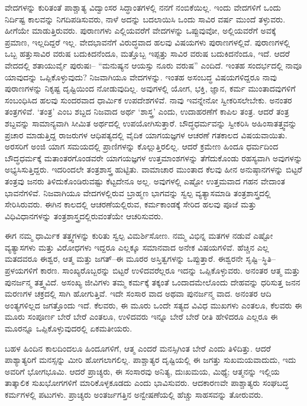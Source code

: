 ವೇದಗಳನ್ನು ಕುರಿತಂತೆ ಪಾಶ್ಚಾತ್ಯ ವಿದ್ವಾಂಸರ ಸಿದ್ಧಾಂತಗಳಲ್ಲಿ ನನಗೆ ನಂಬಿಕೆಯಿಲ್ಲ. ಇಂದು ವೇದಗಳಿಗೆ ಒಂದು ನಿರ್ದಿಷ್ಟ ಕಾಲವನ್ನು ನಿಗದಿಪಡಿಸುವರು, ನಾಳೆ ಅದನ್ನು ಬದಲಾಯಿಸಿ ಒಂದು ಸಾವಿರ ವರ್ಷ ಮುಂದೆ ತಳ್ಳುವರು. ಹೀಗೆಯೇ ಮಾಡುತ್ತಿರುವರು. ಪುರಾಣಗಳು ಎಲ್ಲಿಯವರೆಗೆ ವೇದಗಳನ್ನು ಒಪ್ಪುವುವೋ, ಅಲ್ಲಿಯವರೆಗೆ ಅವಕ್ಕೆ ಪ್ರಮಾಣ, ಇಲ್ಲದಿದ್ದರೆ ಇಲ್ಲ. ವೇದಭಾವನೆಗೆ ವಿರುದ್ಧವಾದ ಹಲವು ವಿಷಯಗಳು ಪುರಾಣಗಳಲ್ಲಿವೆ. ಪುರಾಣಗಳಲ್ಲಿ ಒಬ್ಬ ಹತ್ತುಸಾವಿರ ವರುಷ ಬದುಕಿದನೆಂದೂ, ಮತ್ತೊಬ್ಬ ಇಪ್ಪತ್ತು ಸಾವಿರ ವರುಷ ಬದುಕಿದನೆಂದೂ, ಇದೆ. ಆದರೆ ವೇದದಲ್ಲಿ ಶತಾಯುರ್ವೈ ಪುರುಷಃ– “ಮನುಷ್ಯನ ಆಯಸ್ಸು ನೂರು ವರುಷ” ಎಂದಿದೆ. ಇಂತಹ ಸಂದರ್ಭದಲ್ಲಿ ನಾವೂ ಯಾವುದನ್ನು ಒಪ್ಪಿಕೊಳ್ಳುವುದು? ನಿಜವಾಗಿಯೂ ವೇದಗಳನ್ನು. ಇಂತಹ ಅಸಂಬದ್ಧ ವಿಷಯಗಳಿದ್ದರೂ ನಾವು ಪುರಾಣಗಳನ್ನು ನಿಕೃಷ್ಟ ದೃಷ್ಟಿಯಿಂದ ನೋಡುವುದಿಲ್ಲ. ಅವುಗಳಲ್ಲಿ ಯೋಗ, ಭಕ್ತಿ, ಜ್ಞಾನ, ಕರ್ಮ ಮುಂತಾದವುಗಳಿಗೆ ಸಂಬಂಧಿಸಿದ ಹಲವು ಸುಂದರವಾದ ಧಾರ್ಮಿಕ ಉಪದೇಶಗಳಿವೆ. ನಾವು ಇವನ್ನೇನೋ ಸ್ವೀಕರಿಸಲೇಬೇಕು. ಅನಂತರ ತಂತ್ರಗಳಿವೆ. ‘ತಂತ್ರ’ ಎಂಬ ಶಬ್ದದ ನಿಜವಾದ ಅರ್ಥ ‘ಶಾಸ್ತ್ರ’ ಎಂದು, ಉದಾಹರಣೆಗೆ ಕಾಪಿಲ ತಂತ್ರ. ಆದರೆ ತಂತ್ರ ಶಬ್ದವನ್ನು ಸಾಮಾನ್ಯವಾಗಿ ಸೀಮಿತ ಅರ್ಥದಲ್ಲಿ ಉಪಯೋಗಿಸುತ್ತಾರೆ. ಬೌದ್ಧಧರ್ಮವನ್ನು ಸ್ವೀಕರಿಸಿ ಅಹಿಂಸಾತತ್ತ್ವವನ್ನು ಪ್ರಚಾರ ಮಾಡುತ್ತಿದ್ದ ರಾಜರುಗಳ ಆಧಿಪತ್ಯದಲ್ಲಿ ವೈದಿಕ ಯಾಗಯಜ್ಞಗಳ ಆಚರಣೆ ಗತಕಾಲದ ವಿಷಯವಾಯಿತು. ಅರಸರಿಗೆ ಅಂಜಿ ಯಾಗ ಸಮಯದಲ್ಲಿ ಪ್ರಾಣಿಗಳನ್ನು ಕೊಲ್ಲುತ್ತಿರಲಿಲ್ಲ. ಆದರೆ ಕ್ರಮೇಣ ಹಿಂದೂ ಧರ್ಮದಿಂದ ಬೌದ್ಧಧರ್ಮಕ್ಕೆ ಮತಾಂತರಗೊಂಡವರೇ ಯಾಗಯಜ್ಞಗಳ ಉತ್ತಮಾಂಶಗಳನ್ನು ತೆಗೆದುಕೊಂಡು ರಹಸ್ಯವಾಗಿ ಅವುಗಳನ್ನು ಅಭ್ಯಸಿಸುತ್ತಿದ್ದರು. ಇದರಿಂದಲೇ ತಂತ್ರಶಾಸ್ತ್ರ ಹುಟ್ಟಿತು. ವಾಮಾಚಾರ ಮುಂತಾದ ಕೆಲವು ಹೀನ ಅನುಷ್ಠಾನಗಳನ್ನು ಬಿಟ್ಟರೆ ತಂತ್ರವು ಜನರು ತಿಳಿದುಕೊಂಡಿರುವಷ್ಟು ಕೆಟ್ಟದೇನೂ ಅಲ್ಲ. ಅವುಗಳಲ್ಲಿ ಎಷ್ಟೋ ಉತ್ತಮವಾದ ಗಹನ ವೇದಾಂತ ಭಾವನೆಗಳಿವೆ. ನಿಜವಾಗಿಯೂ ವೇದಗಳಲ್ಲಿರುವ ಬ್ರಾಹ್ಮಣ ಭಾಗವನ್ನು ಸ್ವಲ್ಪ ವ್ಯತ್ಯಾಸಮಾಡಿ ತಂತ್ರಶಾಸ್ತ್ರದಲ್ಲಿ ಸೇರಿಸಿರುವರು. ಈಗಿನ ಕಾಲದಲ್ಲಿ ಆಚರಣೆಯಲ್ಲಿರುವ, ಕರ್ಮಕಾಂಡಕ್ಕೆ ಸೇರಿದ ಹಲವು ಪೂಜೆ ಮತ್ತು ವಿಧಿವಿಧಾನಗಳನ್ನು ತಂತ್ರಶಾಸ್ತ್ರದಲ್ಲಿರುವಂತೆಯೇ ಆಚರಿಸುವರು.

ಈಗ ನಮ್ಮ ಧಾರ್ಮಿಕ ತತ್ತ್ವಗಳನ್ನು ಕುರಿತು ಸ್ವಲ್ಪ ವಿಮರ್ಶಿಸೋಣ. ನಮ್ಮ ವಿಭಿನ್ನ ಮತಗಳ ನಡುವೆ ಎಷ್ಟೋ ವ್ಯತ್ಯಾಸಗಳು ಮತ್ತು ವಿರೋಧಗಳು ಇದ್ದರೂ ಎಲ್ಲಕ್ಕೂ ಸಮಾನವಾದ ಅನೇಕ ವಿಷಯಗಳಿವೆ. ಹೆಚ್ಚಿನ ಎಲ್ಲ ಮತದವರೂ ಈಶ್ವರ, ಆತ್ಮ ಮತ್ತು ಜಗತ್​–ಈ ಮೂರರ ಅಸ್ತಿತ್ವಗಳನ್ನು ಒಪ್ಪುತ್ತಾರೆ. ಈಶ್ವರನೇ ಸೃಷ್ಟಿ–ಸ್ಥಿತಿ–ಪ್ರಳಯಗಳಿಗೆ ಕಾರಣ. ಸಾಂಖ್ಯರೊಬ್ಬರನ್ನು ಬಿಟ್ಟರೆ ಉಳಿದವರೆಲ್ಲರೂ ಇದನ್ನು ಒಪ್ಪಿಕೊಳ್ಳುವರು. ಅನಂತರ ಆತ್ಮ ಮತ್ತು ಪುನರ್ಜನ್ಮ ತತ್ತ್ವವಿದೆ. ಅಸಂಖ್ಯ ಜೀವಿಗಳು ತಮ್ಮ ಕರ್ಮಕ್ಕೆ ತಕ್ಕಂತೆ ಒಂದಾದಮೇಲೊಂದು ದೇಹವನ್ನು ಧರಿಸುತ್ತ ಜನನ ಮರಣಗಳ ಚಕ್ರದಲ್ಲಿ ಸಾಗಿ ಹೋಗುತ್ತಿವೆ. ಇದೇ ಸಂಸಾರ ವಾದ ಅಥವಾ ಪುನರ್ಜನ್ಮ ವಾದ. ಅನಂತರ ಆದಿ ಅಂತ್ಯಗಳಿಲ್ಲದ ಜಗತ್ತೊಂದು ಇದೆ. ಕೆಲವರು, ಈ ಮೂರು ಒಂದೇ ಸತ್ಯದ ವಿವಿಧ ಮುಖಗಳು ಎಂತಲೂ, ಕೆಲವರು ಈ ಮೂರು ಸಂಪೂರ್ಣ ಬೇರೆ ಬೇರೆ ಎಂತಲೂ, ಉಳಿದವರು ಇನ್ನೂ ಬೇರೆ ಬೇರೆ ರೀತಿ ಹೇಳಿದರೂ ಎಲ್ಲರೂ ಈ ಮೂರನ್ನೂ ಒಪ್ಪಿಕೊಳ್ಳುವುದರಲ್ಲಿ ಏಕಮತೀಯರು.

\vskip 4pt

ಬಹಳ ಹಿಂದಿನ ಕಾಲದಿಂದಲೂ ಹಿಂದೂಗಳಿಗೆ, ಆತ್ಮ ಎಂದರೆ ಮನಸ್ಸಿಗಿಂತ ಬೇರೆ ಎಂದು ತಿಳಿದಿತ್ತು. ಆದರೆ ಪಾಶ್ಯಾತ್ಯರಿಗೆ ಮನಸ್ಸನ್ನು ಮೀರಿ ಹೋಗಲಾಗಲಿಲ್ಲ. ಪಾಶ್ಚಾತ್ಯರ ದೃಷ್ಟಿಯಲ್ಲಿ ಈ ಜಗತ್ತು ಸುಖಮಯವಾದುದು, ಇದು ಅವರಿಗೆ ಭೋಗಭೂಮಿ. ಆದರೆ ಪ್ರಾಚ್ಯರು, ಈ ಸಂಸಾರವು ಅನಿತ್ಯ, ದುಃಖಮಯ, ಮಿಥ್ಯೆ; ಆತ್ಮನನ್ನು ಇಲ್ಲಿಯ ತಾತ್ಕಾಲಿಕ ಸುಖಭೋಗಗಳಿಗೆ ಮಾರಿಕೊಳ್ಳಕೂಡದು ಎಂದು ಭಾವಿಸುವರು. ಆದಕಾರಣವೇ ಪಾಶ್ಚಾತ್ಯರು ಸಂಘಬದ್ಧ ಕರ್ಮಗಳಲ್ಲಿ ಪಟುಗಳು. ಪ್ರಾಚ್ಯರು ಅಂತರ್ಜಗತ್ತಿನ ಅನ್ವೇಷಣೆಯಲ್ಲಿ ಹೆಚ್ಚು ಸಾಹಸವನ್ನು ತೋರುವರು.

